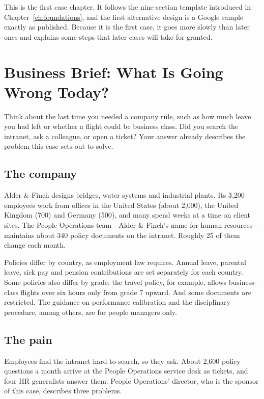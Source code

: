 This is the first case chapter. It follows the nine-section template introduced in Chapter~\ref{ch:foundations}, and the first alternative design is a Google sample exactly as published. Because it is the first case, it goes more slowly than later ones and explains some steps that later cases will take for granted.

\section{Business Brief: What Is Going Wrong Today?}
\label{sec:policy-brief}

\begin{thinkabout}
Think about the last time you needed a company rule, such as how much leave you had left or whether a flight could be business class. Did you search the intranet, ask a colleague, or open a ticket? Your answer already describes the problem this case sets out to solve.
\end{thinkabout}

\subsection{The company}

Alder \& Finch designs bridges, water systems and industrial plants. Its 3{,}200 employees work from offices in the United States (about 2{,}000), the United Kingdom (700) and Germany (500), and many spend weeks at a time on client sites. The People Operations team---Alder \& Finch's name for human resources---maintains about 340 policy documents on the intranet. Roughly 25 of them change each month.

Policies differ by country, as employment law requires. Annual leave, parental leave, sick pay and pension contributions are set separately for each country. Some policies also differ by grade: the travel policy, for example, allows business-class flights over six hours only from grade 7 upward. And some documents are restricted. The guidance on performance calibration and the disciplinary procedure, among others, are for people managers only.

\subsection{The pain}

Employees find the intranet hard to search, so they ask. About 2{,}600 policy questions a month arrive at the People Operations service desk as tickets, and four HR generalists answer them. People Operations' director, who is the sponsor of this case, describes three problems.

